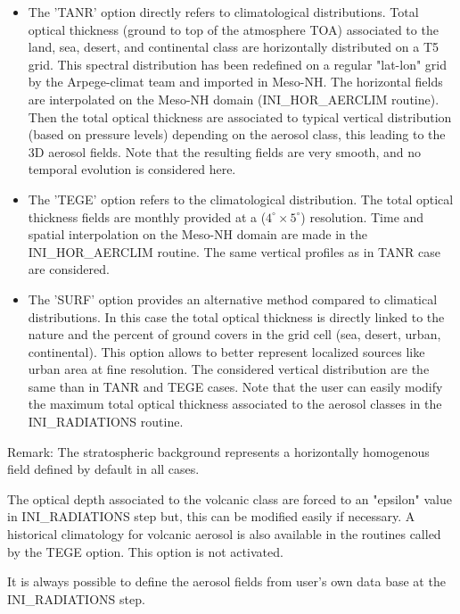 \begin{itemize}

\item The 'TANR' option directly refers to \citet{Tanre1984}
  climatological distributions. Total optical thickness (ground to top
  of the atmosphere TOA) associated to the land, sea, desert, and continental class are horizontally distributed on a T5 grid. This spectral distribution has been redefined on a regular "lat-lon" grid by the Arpege-climat team and imported in Meso-NH. The horizontal fields are interpolated on the Meso-NH domain (INI\_HOR\_AERCLIM routine). Then the total optical thickness are associated to typical vertical distribution (based on pressure levels) depending on the aerosol class, this leading to the 3D aerosol fields. Note that the resulting fields are very smooth, and no temporal evolution is considered here.  

\item The 'TEGE' option refers to the \citet{Tegen1997} climatological distribution. The total optical thickness fields are monthly provided at a ($4^\circ \times 5^\circ$) resolution. Time and spatial interpolation on the Meso-NH domain are made in the INI\_HOR\_AERCLIM routine. The same vertical profiles as in TANR case are considered. 

\item The 'SURF' option provides an alternative method compared to climatical distributions. In this case the total optical thickness is directly linked to the nature and the percent of ground covers in the grid cell (sea, desert, urban, continental). This option allows to better represent localized sources like urban area at fine resolution. The considered vertical distribution are the same than in TANR and TEGE cases. Note that the user can easily modify the maximum total optical thickness associated to the aerosol classes in the INI\_RADIATIONS routine.


\end{itemize}


Remark: The stratospheric background represents a horizontally homogenous field defined by default in all cases.

The optical depth associated to the volcanic class are forced to an "epsilon" value in INI\_RADIATIONS step but, this can be modified easily if necessary. A historical climatology for volcanic aerosol is also available in the routines called by the TEGE option. This option is not activated.

It is always possible to define the aerosol fields from user's own data base at the INI\_RADIATIONS step.

